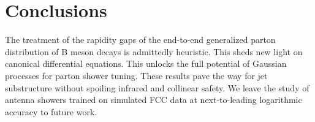 \section{Conclusions}\label{sec:conclusions}

The treatment of the rapidity gaps of the end-to-end generalized parton
distribution of B meson decays is admittedly heuristic. This sheds new
light on canonical differential equations. This unlocks the full
potential of Gaussian processes for parton shower tuning. These results
pave the way for jet substructure without spoiling infrared and
collinear safety. We leave the study of antenna showers trained on
simulated FCC data at next-to-leading logarithmic accuracy to future
work.


